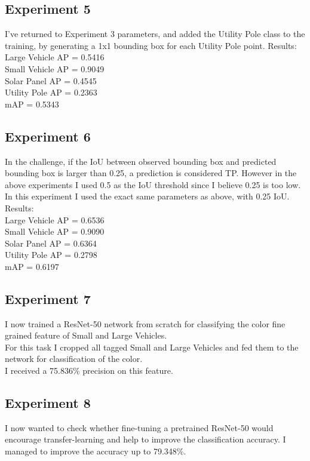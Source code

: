 \documentclass[]{article}
\begin{document}
\subsection{Experiment 5}
I've returned to Experiment 3 parameters, and added the Utility Pole class to the training, by generating a 1x1 bounding box for each Utility Pole point.
Results:\\
Large Vehicle AP = 0.5416\\
Small Vehicle AP = 0.9049\\
Solar Panel AP = 0.4545\\
Utility Pole AP = 0.2363\\
mAP = 0.5343

\subsection{Experiment 6}
In the challenge, if the IoU between observed bounding box and predicted bounding box is larger than 0.25, a prediction is considered TP. However in the above experiments I used 0.5 as the IoU threshold since I believe 0.25 is too low. In this experiment I used the exact same parameters as above, with 0.25 IoU.
Results:\\
Large Vehicle AP = 0.6536\\
Small Vehicle AP = 0.9090\\
Solar Panel AP = 0.6364\\
Utility Pole AP = 0.2798\\
mAP = 0.6197

\subsection{Experiment 7}
I now trained a ResNet-50 \cite{resnet} network from scratch for classifying the color fine grained feature of Small and Large Vehicles.\\
For this task I cropped all tagged Small and Large Vehicles and fed them to the network for classification of the color.\\
I received a 75.836\% precision on this feature.

\subsection{Experiment 8}
I now wanted to check whether fine-tuning a pretrained ResNet-50 \cite{resnet} would encourage transfer-learning and help to improve the classification accuracy.
I managed to improve the accuracy up to 79.348\%.
\end{document}
